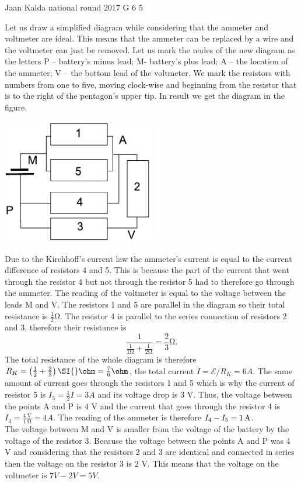 \documentclass[11pt]{article}
\begin{document}
{Jaan Kalda} %
{national round} %
{2017} %
{G 6} %
{5} %
{

\ifEngSolution
Let us draw a simplified diagram while considering that the ammeter and voltmeter are ideal. This means that the ammeter can be replaced by a wire and the voltmeter can just be removed. Let us mark the nodes of the new diagram as the letters P – battery’s minus lead; M- battery’s plus lead; A – the location of the ammeter; V – the bottom lead of the voltmeter. We mark the resistors with numbers from one to five, moving clock-wise and beginning from the resistor that is to the right of the pentagon’s upper tip. In result we get the diagram in the figure.
\begin{center}
	\includegraphics[width=0.5\textwidth]{2017-v3g-06-viisnurk-lah}
\end{center}
Due to the Kirchhoff’s current law the ammeter’s current is equal to the current difference of resistors 4 and 5. This is because the part of the current that went through the resistor 4 but not through the resistor 5 had to therefore go through the ammeter. The reading of the voltmeter is equal to the voltage between the leads M and V. The resistors 1 and 5 are parallel in the diagram so their total resistance is $\frac12 \si{\ohm}$. The resistor 4 is parallel to the series connection of resistors 2 and 3, therefore their resistance is
$$\frac{1}{\frac{1}{1\si{\ohm}}+\frac{1}{2\si{\ohm}}} = \frac 23 \si{\ohm}. $$ 
The total resistance of the whole diagram is therefore $R_K=\left(\frac 12 + 
\frac 23\right)\SI{}\ohm=\frac 76\ohm$, the total current $I=\mathcal 
E/R_K=\SI{6}A$. The same amount of current goes through the resistors 1 and 5 which is why the current of resistor 5 is $I_5=\frac 12 I=\SI{3}A$ and its voltage drop is 3 V. Thus, the voltage between the points A and P is 4 V and the current that goes through the resistor 4 is $I_4=\frac{\SI{4}{\volt}}{\SI{1}{\ohm}}=\SI{4}A$. The reading of the ammeter is therefore $I_4-I_5=\SI 1A$.\\
The voltage between M and V is smaller from the voltage of the battery by the voltage of the resistor 3. Because the voltage between the points A and P was 4 V and considering that the resistors 2 and 3 are identical and connected in series then the voltage on the resistor 3 is 2 V. This means that the voltage on the voltmeter is $\SI{7}V -\SI{2}V= \SI{5}V$.
\fi
}
\end{document}
